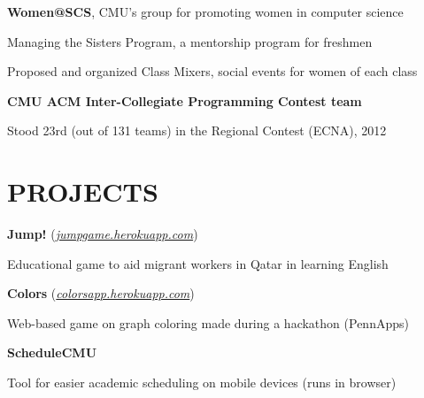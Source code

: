 \documentclass[margin, 11pt]{res} %
\begin{document}
\begin{resume}
\vspace{3pt}

{\bf Women@SCS}, CMU's group for promoting women in computer science

\begin{itemize} \itemsep -2pt
{\small \item Managing the Sisters Program, a mentorship program for freshmen
\item Proposed and organized Class Mixers, social events for women of each class}
\end{itemize}

\vspace{3pt}

{\bf CMU ACM Inter-Collegiate Programming Contest team}
\begin{itemize} \itemsep -2pt
{\small \item Stood 23rd (out of 131 teams) in the Regional Contest (ECNA), 2012}
\end{itemize}

\section{PROJECTS}

{\bf Jump!} (\href{http://jumpgame.herokuapp.com/}{\sl jumpgame.herokuapp.com})

\begin{itemize} \itemsep -2pt
{\small \item Educational game to aid migrant workers in Qatar in learning English}
\end{itemize}

\vspace{3pt}

{\bf Colors} (\href{http://colorsapp.herokuapp.com}{\sl colorsapp.herokuapp.com})
\begin{itemize} \itemsep -2pt
{\small \item Web-based game on graph coloring made during a hackathon (PennApps)}
\end{itemize}

\vspace{3pt}

{\bf ScheduleCMU}
\begin{itemize} \itemsep -2pt
{\small \item Tool for easier academic scheduling on mobile devices (runs in browser)}
\end{itemize}


\end{resume}
\end{document}
